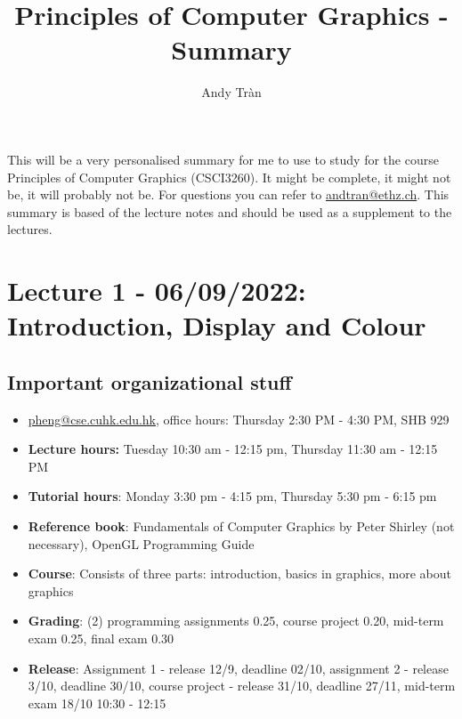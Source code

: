 \documentclass[11pt]{article}
\begin{document}
 
 
\title{Principles of Computer Graphics - Summary}%
\author{Andy Tràn}
 
\maketitle %

This will be a very personalised summary for me to use to study for the course Principles of Computer Graphics (CSCI3260). It might be complete, it might not be, it will probably not be. For questions you can refer to \href{mailto:andtran@ethz.ch}{andtran@ethz.ch}. This summary is based of the lecture notes and should be used as a supplement to the lectures. 

\tableofcontents

\newpage

\section{Lecture 1 - 06/09/2022: Introduction, Display and Colour}
\subsection{Important organizational stuff}
\begin{itemize}
    \item \href{mailto:pheng@cse.cuhk.edu.hk}{pheng@cse.cuhk.edu.hk}, office hours: Thursday 2:30 PM - 4:30 PM, SHB 929
    \item \textbf{Lecture hours:}  Tuesday 10:30 am - 12:15 pm, Thursday 11:30 am - 12:15 PM
    \item \textbf{Tutorial hours}: Monday 3:30 pm - 4:15 pm, Thursday 5:30 pm - 6:15 pm 
    \item \textbf{Reference book}: Fundamentals of Computer Graphics by Peter Shirley (not necessary), OpenGL Programming Guide
    \item \textbf{Course}: Consists of three parts: introduction, basics in graphics, more about graphics 
    \item \textbf{Grading}: (2) programming assignments 0.25, course project 0.20, mid-term exam 0.25, final exam 0.30
    \item \textbf{Release}: Assignment 1 - release 12/9, deadline 02/10, assignment 2 - release 3/10, deadline 30/10, course project - release 31/10, deadline 27/11, mid-term exam 18/10 10:30 - 12:15
\end{itemize}
\end{document}
